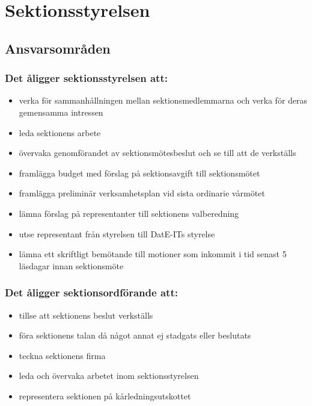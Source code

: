\section{Sektionsstyrelsen}

\subsection{Ansvarsområden}

\subsubsection{Det åligger sektionsstyrelsen att:}

\begin{itemize}
  \item verka för sammanhållningen mellan sektionsmedlemmarna och verka för deras gemensamma intressen 
  \item leda sektionens arbete 
  \item övervaka genomförandet av sektionsmötesbeslut och se till att de verkställs 
  \item framlägga budget med förslag på sektionsavgift till sektionsmötet 
  \item framlägga preliminär verksamhetsplan vid sista ordinarie vårmötet 
  \item lämna förslag på representanter till sektionens valberedning 
  \item utse representant från styrelsen till DatE-ITs styrelse
  \item lämna ett skriftligt bemötande till motioner som inkommit i tid senast 5 läsdagar innan sektionsmöte
\end{itemize}

\subsubsection{Det åligger sektionsordförande att:} 

\begin{itemize}
  \item tillse att sektionens beslut verkställs 
  \item föra sektionens talan då något annat ej stadgats eller beslutats 
  \item teckna sektionens firma 
  \item leda och övervaka arbetet inom sektionsstyrelsen 
  \item representera sektionen på kårledningsutskottet
\end{itemize}

